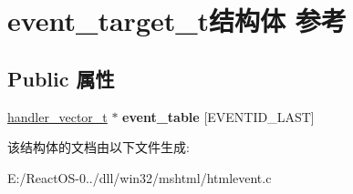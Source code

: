 \hypertarget{structevent__target__t}{}\section{event\+\_\+target\+\_\+t结构体 参考}
\label{structevent__target__t}
\subsection*{Public 属性}
\begin{DoxyCompactItemize}
\item 
\mbox{\label{structevent__target__t_a06dfc69ac93bd95e3f3cb02f6782a08a}} 
\hyperlink{structhandler__vector__t}{handler\+\_\+vector\+\_\+t} $\ast$ {\bfseries event\+\_\+table} \mbox{[}E\+V\+E\+N\+T\+I\+D\+\_\+\+L\+A\+ST\mbox{]}
\end{DoxyCompactItemize}


该结构体的文档由以下文件生成\+:\begin{DoxyCompactItemize}
\item 
E\+:/\+React\+O\+S-\/0../dll/win32/mshtml/htmlevent.\+c\end{DoxyCompactItemize}
